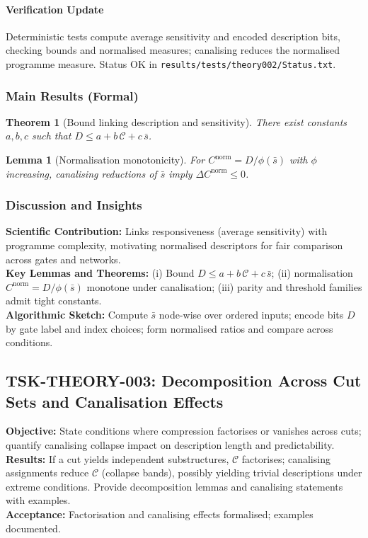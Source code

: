 \documentclass[11pt]{article}
\newtheorem{theorem}{Theorem}
\newtheorem{lemma}{Lemma}
\begin{document}
\paragraph{Verification Update} Deterministic tests compute average sensitivity and encoded description bits, checking bounds and normalised measures; canalising reduces the normalised programme measure. Status OK in \texttt{results/tests/theory002/Status.txt}.
\subsubsection*{Main Results (Formal)}
\begin{theorem}[Bound linking description and sensitivity]
There exist constants \(a,b,c\) such that \(D \le a + b\,\mathcal{C} + c\,\bar{s}\).
\end{theorem}
\begin{lemma}[Normalisation monotonicity]
For \(C^{\mathrm{norm}}=D/\phi(\bar{s})\) with \(\phi\) increasing, canalising reductions of \(\bar{s}\) imply \(\Delta C^{\mathrm{norm}}\le 0\).
\end{lemma}
\subsubsection*{Discussion and Insights}
\textbf{Scientific Contribution:} Links responsiveness (average sensitivity) with programme complexity, motivating normalised descriptors for fair comparison across gates and networks.\\
\textbf{Key Lemmas and Theorems:} (i) Bound \(D \le a + b\,\mathcal{C} + c\,\bar{s}\); (ii) normalisation \(C^{\mathrm{norm}}=D/\phi(\bar{s})\) monotone under canalisation; (iii) parity and threshold families admit tight constants.\\
\textbf{Algorithmic Sketch:} Compute \(\bar{s}\) node-wise over ordered inputs; encode bits \(D\) by gate label and index choices; form normalised ratios and compare across conditions.

\subsection{TSK-THEORY-003: Decomposition Across Cut Sets and Canalisation Effects}
\textbf{Objective:} State conditions where compression factorises or vanishes across cuts; quantify canalising collapse impact on description length and predictability.\\
\textbf{Results:} If a cut yields independent substructures, \(\mathcal{C}\) factorises; canalising assignments reduce \(\mathcal{C}\) (collapse bands), possibly yielding trivial descriptions under extreme conditions. Provide decomposition lemmas and canalising statements with examples.\\
\textbf{Acceptance:} Factorisation and canalising effects formalised; examples documented.\
\end{document}
